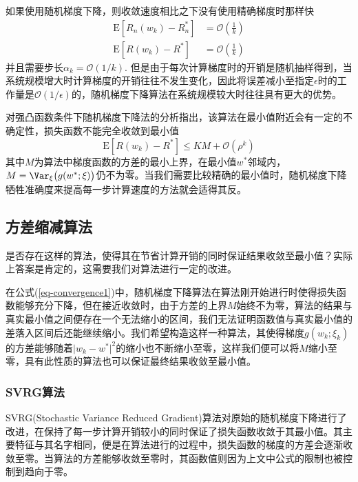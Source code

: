 如果使用随机梯度下降，则收敛速度相比之下没有使用精确梯度时那样快
\begin{align}\label{key}
\mathrm{E}[R_n(w_k)-R_n^*]&=\mathcal{O}(\frac1k)\\
\mathrm{E}[R(w_k)-R^*]&=\mathcal{O}(\frac1k)
\end{align}
并且需要步长$\alpha_k=\mathcal{O}(1/k)$. 但是由于每次计算梯度时的开销是随机抽样得到，当系统规模增大时计算梯度的开销往往不发生变化，因此将误差减小至指定$\epsilon$时的工作量是$\mathcal{O}(1/\epsilon)$的，随机梯度下降算法在系统规模较大时往往具有更大的优势。

对强凸函数条件下随机梯度下降法的分析\cite[27]{bottouOptimizationMethodsLargeScale2018}指出，该算法在最小值附近会有一定的不确定性，损失函数不能完全收敛到最小值
\begin{equation}\label{eq-convergence1}
\mathrm{E}\left[R(w_{k})-R^*\right]\leq KM+\mathcal{O}(\rho^k)
\end{equation}
其中$M$为算法中梯度函数的方差的最小上界，在最小值$w^*$邻域内，$M=\Var_\xi\big(g(w^*;\xi)\big)$仍不为零。当我们需要比较精确的最小值时，随机梯度下降牺牲准确度来提高每一步计算速度的方法就会适得其反。

\subsection{方差缩减算法}

是否存在这样的算法，使得其在节省计算开销的同时保证结果收敛至最小值？实际上答案是肯定的，这需要我们对算法进行一定的改进。

在公式(\ref{eq-convergence1})中，随机梯度下降算法在算法刚开始进行时使得损失函数能够充分下降，但在接近收敛时，由于方差的上界$M$始终不为零，算法的结果与真实最小值之间便存在一个无法缩小的区间，我们无法证明函数值与真实最小值的差落入区间后还能继续缩小。我们希望构造这样一种算法，其使得梯度$g(w_k;\xi_k)$的方差能够随着$\lvert w_k-w^*\rvert^2$的缩小也不断缩小至零，这样我们便可以将$M$缩小至零，具有此性质的算法也可以保证最终结果收敛至最小值。

\subsubsection{SVRG算法}

SVRG(Stochastic Variance Reduced Gradient)\cite{johnsonAcceleratingStochasticGradient}算法对原始的随机梯度下降进行了改进，在保持了每一步计算开销较小的同时保证了损失函数收敛于其最小值。其主要特征与其名字相同，便是在算法进行的过程中，损失函数的梯度的方差会逐渐收敛至零。当算法的方差能够收敛至零时，其函数值则因为上文中公式的限制也被控制到趋向于零。

